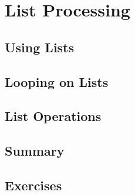\chapter{List Processing}

\section{Using Lists}


\section{Looping on Lists}


\section{List Operations}

\section{Summary}


\section{Exercises}

